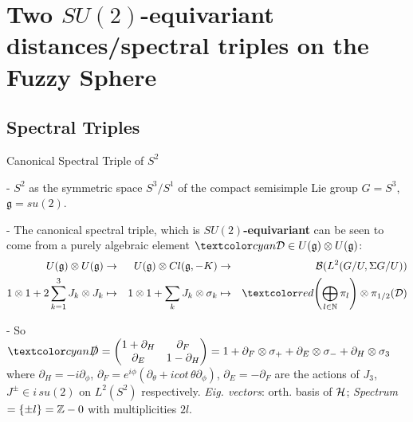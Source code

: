 \section{Two $SU(2)$-equivariant distances/spectral triples on the Fuzzy Sphere}

\subsection{Spectral Triples}

\begin{frame}{Canonical Spectral Triple of $S^2$} %


- $S^2$ as the symmetric space $S^3/S^1$ of the compact semisimple Lie group $G = S^3$, $\mathfrak g = su(2)$.
    
- The canonical spectral triple, which is \textbf{$SU(2)$-equivariant} can be seen to come from a purely algebraic element $\lbtext{\mathcal D} \in U(\mathfrak g) \otimes U(\mathfrak g)$:
    \begin{align*}
        U(\mathfrak g) \otimes U(\mathfrak g) &\to& U(\mathfrak g) \otimes Cl(\mathfrak g, -K) &\to& \mathcal B(L^2(G/U, \Sigma G/U)) \\
        1 \otimes 1 + 2 \sum_{k = 1}^3 J_k \otimes J_k &\mapsto& 1 \otimes 1 + \sum_k J_k \otimes \sigma_k &\mapsto& \rtext{\left( \bigoplus_{l\in \bb N} \pi_l \right) \otimes \pi_{1/2}(\mathcal D)}
    \end{align*}
    

- So $\lbtext{\slashed D} = \begin{pmatrix} 1 + \partial_H & \partial_F \\ \partial_E & 1 - \partial_H\end{pmatrix} = 1 + \partial_F \otimes \sigma_+ + \partial_E \otimes \sigma_- + \partial_H \otimes \sigma_3$ where $\partial_H = -i \partial_\phi$, $\partial_F = e^{i\phi} \left( \partial_\theta + i cot\,\theta \partial_\phi \right)$, $\partial_E = -\partial_F%
$ are the actions of $J_3$, $J^\pm \in i\,su(2)$ on $L^2(S^2)$ respectively. \textit{Eig. vectors}: orth. basis of $\mathcal H$; \textit{Spectrum} $= \{\pm l\} = \mathbb Z - 0$ with multiplicities $2l$.%


\end{frame}
